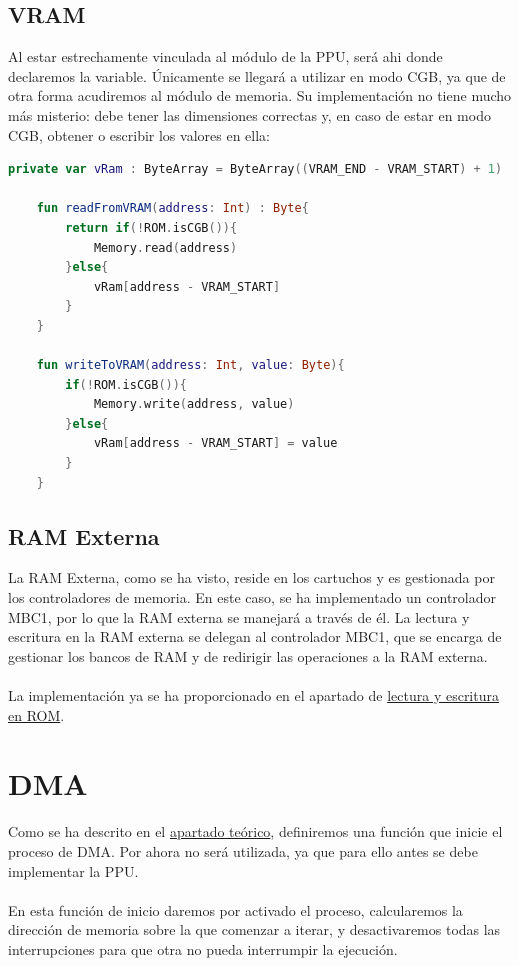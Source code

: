 \subsection{VRAM}

Al estar estrechamente vinculada al módulo de la PPU, será ahi donde declaremos la variable. Únicamente se llegará a utilizar en modo CGB, ya que de otra forma acudiremos al módulo de memoria. Su implementación no tiene mucho más misterio: debe tener las dimensiones correctas y, en caso de estar en modo CGB, obtener o escribir los valores en ella:

\begin{lstlisting}[language=Kotlin, caption={Lectura y escritura en Video RAM.}, label={code:vramreadwrite}]
    private var vRam : ByteArray = ByteArray((VRAM_END - VRAM_START) + 1)

    fun readFromVRAM(address: Int) : Byte{
        return if(!ROM.isCGB()){
            Memory.read(address)
        }else{
            vRam[address - VRAM_START]
        }
    }

    fun writeToVRAM(address: Int, value: Byte){
        if(!ROM.isCGB()){
            Memory.write(address, value)
        }else{
            vRam[address - VRAM_START] = value
        }
    }
\end{lstlisting}

\subsection{RAM Externa}

La RAM Externa, como se ha visto, reside en los cartuchos y es gestionada por los controladores de memoria. En este caso, se ha implementado un controlador MBC1, por lo que la RAM externa se manejará a través de él. La lectura y escritura en la RAM externa se delegan al controlador MBC1, que se encarga de gestionar los bancos de RAM y de redirigir las operaciones a la RAM externa.
\\\\
La implementación ya se ha proporcionado en el apartado de \hyperref[rom:read_write]{lectura y escritura en ROM}.

\section{DMA}

Como se ha descrito en el \hyperref[dma]{apartado teórico}, definiremos una función que inicie el proceso de DMA. Por ahora no será utilizada, ya que para ello antes se debe implementar la PPU.
\\\\
En esta función de inicio daremos por activado el proceso, calcularemos la dirección de memoria sobre la que comenzar a iterar, y desactivaremos todas las interrupciones para que otra no pueda interrumpir la ejecución.

